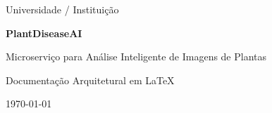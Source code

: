 \documentclass[12pt,a4paper]{report}
\begin{document}
\begin{titlepage}
    \centering
    {\Large Universidade / Instituição}\par
    \vspace{2cm}
    {\LARGE\bfseries PlantDiseaseAI\par}
    \vspace{0.8cm}
    {\Large Microserviço para Análise Inteligente de Imagens de Plantas\par}
    \vspace{2cm}
    {\large Documentação Arquitetural em \LaTeX\par}
    \vfill
    {\large \today\par}
\end{titlepage}

\tableofcontents
\listoffigures
\listoftables
\clearpage
{}















\end{document}
